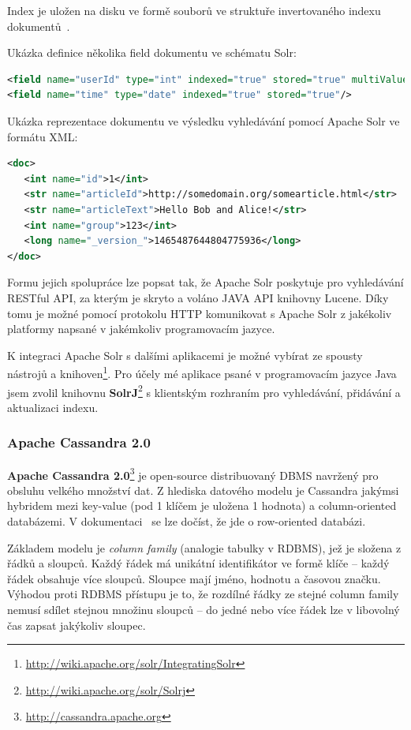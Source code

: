 \documentclass[thesis=M,czech]{FITthesis}[2014/05/07]
\begin{document}
Index je uložen na disku ve formě souborů ve struktuře invertovaného indexu dokumentů~\cite{wiki:invindex}.

Ukázka definice několika field dokumentu ve schématu Solr:

\begin{lstlisting}[language=xml]
<field name="userId" type="int" indexed="true" stored="true" multiValued="true"/>	
<field name="time" type="date" indexed="true" stored="true"/>
\end{lstlisting}

Ukázka reprezentace dokumentu ve výsledku vyhledávání pomocí Apache Solr ve formátu XML:

\begin{lstlisting}[language=xml]
<doc>
   <int name="id">1</int>
   <str name="articleId">http://somedomain.org/somearticle.html</str>
   <str name="articleText">Hello Bob and Alice!</str>
   <int name="group">123</int>
   <long name="_version_">1465487644804775936</long>      
</doc>
\end{lstlisting}

Formu jejich spolupráce lze popsat tak, že Apache Solr poskytuje pro vyhledávání RESTful API, za kterým je skryto a voláno JAVA API knihovny Lucene. Díky tomu je možné pomocí protokolu HTTP komunikovat s Apache Solr z jakékoliv platformy napsané v jakémkoliv programovacím jazyce. 

K integraci Apache Solr s dalšími aplikacemi je možné vybírat ze spousty nástrojů a knihoven\footnote{\url{http://wiki.apache.org/solr/IntegratingSolr}}. Pro účely mé aplikace psané v programovacím jazyce Java jsem zvolil knihovnu \textbf{SolrJ}\footnote{\url{http://wiki.apache.org/solr/Solrj}} s klientským rozhraním pro vyhledávání, přidávání a aktualizaci indexu. 

\subsubsection{Apache Cassandra 2.0}
\textbf{Apache Cassandra 2.0}\footnote{\url{http://cassandra.apache.org}} je open-source distribuovaný DBMS navržený pro obsluhu velkého množství dat. Z hlediska datového modelu je Cassandra jakýmsi hybridem mezi key-value (pod 1 klíčem je uložena 1 hodnota) a column-oriented databázemi. V dokumentaci~\cite{cassdoc} se lze dočíst, že jde o row-oriented databázi.

Základem modelu je \emph{column family} (analogie tabulky v RDBMS), jež je složena z řádků a sloupců. Každý řádek má unikátní identifikátor ve formě klíče – každý řádek obsahuje více sloupců. Sloupce mají jméno, hodnotu a časovou značku. Výhodou proti RDBMS přístupu je to, že rozdílné řádky ze stejné column family nemusí sdílet stejnou množinu sloupců – do jedné nebo více řádek lze v libovolný čas zapsat jakýkoliv sloupec.
\end{document}
